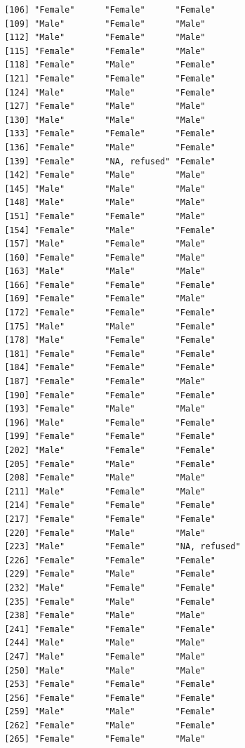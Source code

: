 \documentclass{beamer}\usepackage[]{graphicx}\usepackage[]{color}
\makeatletter
\newenvironment{kframe}{%
 \def\at@end@of@kframe{}%
 \ifinner\ifhmode%
  \def\at@end@of@kframe{\end{minipage}}%
  \begin{minipage}{\columnwidth}%
 \fi\fi%
 \def\FrameCommand##1{\hskip\@totalleftmargin \hskip-\fboxsep
 \colorbox{shadecolor}{##1}\hskip-\fboxsep
     \hskip-\linewidth \hskip-\@totalleftmargin \hskip\columnwidth}%
 \MakeFramed {\advance\hsize-\width
   \@totalleftmargin\z@ \linewidth\hsize
   \@setminipage}}%
 {\par\unskip\endMakeFramed%
 \at@end@of@kframe}
\newenvironment{knitrout}{}{} %
\makeatother
\begin{document}
\begin{frame}[fragile]
\begin{knitrout}
\begin{kframe}
\begin{verbatim}
 [106] "Female"      "Female"      "Female"     
 [109] "Male"        "Female"      "Male"       
 [112] "Male"        "Female"      "Male"       
 [115] "Female"      "Female"      "Male"       
 [118] "Female"      "Male"        "Female"     
 [121] "Female"      "Female"      "Female"     
 [124] "Male"        "Male"        "Female"     
 [127] "Female"      "Male"        "Male"       
 [130] "Male"        "Male"        "Male"       
 [133] "Female"      "Female"      "Female"     
 [136] "Female"      "Male"        "Female"     
 [139] "Female"      "NA, refused" "Female"     
 [142] "Female"      "Male"        "Male"       
 [145] "Male"        "Male"        "Male"       
 [148] "Male"        "Male"        "Male"       
 [151] "Female"      "Female"      "Male"       
 [154] "Female"      "Male"        "Female"     
 [157] "Male"        "Female"      "Male"       
 [160] "Female"      "Female"      "Male"       
 [163] "Male"        "Male"        "Male"       
 [166] "Female"      "Female"      "Female"     
 [169] "Female"      "Female"      "Male"       
 [172] "Female"      "Female"      "Female"     
 [175] "Male"        "Male"        "Female"     
 [178] "Male"        "Female"      "Female"     
 [181] "Female"      "Female"      "Female"     
 [184] "Female"      "Female"      "Female"     
 [187] "Female"      "Female"      "Male"       
 [190] "Female"      "Female"      "Female"     
 [193] "Female"      "Male"        "Male"       
 [196] "Male"        "Female"      "Female"     
 [199] "Female"      "Female"      "Female"     
 [202] "Male"        "Female"      "Female"     
 [205] "Female"      "Male"        "Female"     
 [208] "Female"      "Male"        "Male"       
 [211] "Male"        "Female"      "Male"       
 [214] "Female"      "Female"      "Female"     
 [217] "Female"      "Female"      "Female"     
 [220] "Female"      "Male"        "Male"       
 [223] "Male"        "Female"      "NA, refused"
 [226] "Female"      "Female"      "Female"     
 [229] "Female"      "Male"        "Female"     
 [232] "Male"        "Female"      "Female"     
 [235] "Female"      "Male"        "Female"     
 [238] "Female"      "Male"        "Male"       
 [241] "Female"      "Female"      "Female"     
 [244] "Male"        "Male"        "Male"       
 [247] "Male"        "Female"      "Male"       
 [250] "Male"        "Male"        "Male"       
 [253] "Female"      "Female"      "Female"     
 [256] "Female"      "Female"      "Female"     
 [259] "Male"        "Male"        "Female"     
 [262] "Female"      "Male"        "Female"     
 [265] "Female"      "Female"      "Male"       

\end{verbatim}
\end{kframe}
\end{knitrout}
\end{frame}
\end{document}
